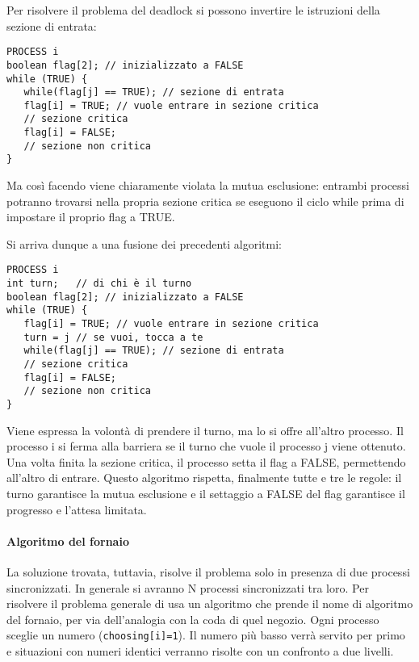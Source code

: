 \documentclass[a4]{article}
\begin{document}
Per risolvere il problema del deadlock si possono invertire le istruzioni della sezione di entrata:
\begin{verbatim}
PROCESS i
boolean flag[2]; // inizializzato a FALSE
while (TRUE) {
   while(flag[j] == TRUE); // sezione di entrata
   flag[i] = TRUE; // vuole entrare in sezione critica
   // sezione critica
   flag[i] = FALSE;
   // sezione non critica
}
\end{verbatim}
Ma così facendo viene chiaramente violata la mutua esclusione: entrambi processi potranno trovarsi nella propria sezione critica se eseguono il ciclo while prima di impostare il proprio flag a TRUE.

Si arriva dunque a una fusione dei precedenti algoritmi:
\begin{verbatim}
PROCESS i
int turn;   // di chi è il turno
boolean flag[2]; // inizializzato a FALSE
while (TRUE) {
   flag[i] = TRUE; // vuole entrare in sezione critica
   turn = j // se vuoi, tocca a te
   while(flag[j] == TRUE); // sezione di entrata
   // sezione critica
   flag[i] = FALSE;
   // sezione non critica
}
\end{verbatim}
Viene espressa la volontà di prendere il turno, ma lo si offre all'altro processo. Il processo i si ferma alla barriera se il turno che vuole il processo j viene ottenuto. Una volta finita la sezione critica, il processo setta il flag a FALSE, permettendo all'altro di entrare. Questo algoritmo rispetta, finalmente tutte e tre le regole: il turno garantisce la mutua esclusione e il settaggio a FALSE del flag garantisce il progresso e l'attesa limitata.

\paragraph{Algoritmo del fornaio}
La soluzione trovata, tuttavia, risolve il problema solo in presenza di due processi sincronizzati. In generale si avranno N processi sincronizzati tra loro. Per risolvere il problema generale di usa un algoritmo che prende il nome di algoritmo del fornaio, per via dell'analogia con la coda di quel negozio. Ogni processo sceglie un numero (\texttt{choosing[i]=1}). Il numero più basso verrà servito per primo e situazioni con numeri identici verranno risolte con un confronto a due livelli.
\end{document}
